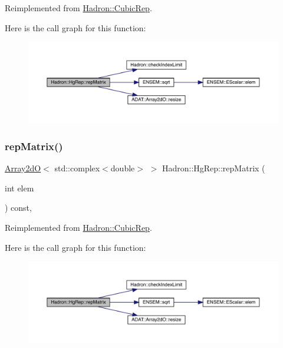 Reimplemented from \mbox{\hyperlink{structHadron_1_1CubicRep_ac5d7e9e6f4ab1158b5fce3e4ad9e8005}{Hadron\+::\+Cubic\+Rep}}.

Here is the call graph for this function\+:
\nopagebreak
\begin{figure}[H]
\begin{center}
\leavevmode
\includegraphics[width=350pt]{d5/d3a/structHadron_1_1HgRep_a1ca0a9c28a8e0a9aba561029b7e61f08_cgraph}
\end{center}
\end{figure}
\mbox{\label{structHadron_1_1HgRep_a1ca0a9c28a8e0a9aba561029b7e61f08}} 
\subsubsection{\texorpdfstring{repMatrix()}{repMatrix()}\hspace{0.1cm}{\footnotesize\ttfamily [3/3]}}
{\footnotesize\ttfamily \mbox{\hyperlink{classADAT_1_1Array2dO}{Array2dO}}$<$ std\+::complex$<$double$>$ $>$ Hadron\+::\+Hg\+Rep\+::rep\+Matrix (\begin{DoxyParamCaption}\item[{int}]{elem }\end{DoxyParamCaption}) const\hspace{0.3cm}{\ttfamily [inline]}, {\ttfamily [virtual]}}



Reimplemented from \mbox{\hyperlink{structHadron_1_1CubicRep_ac5d7e9e6f4ab1158b5fce3e4ad9e8005}{Hadron\+::\+Cubic\+Rep}}.

Here is the call graph for this function\+:
\nopagebreak
\begin{figure}[H]
\begin{center}
\leavevmode
\includegraphics[width=350pt]{d5/d3a/structHadron_1_1HgRep_a1ca0a9c28a8e0a9aba561029b7e61f08_cgraph}
\end{center}
\end{figure}


